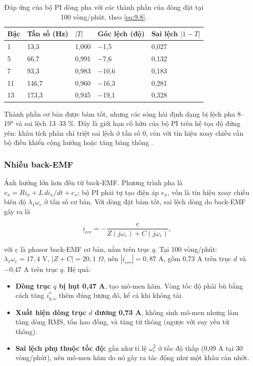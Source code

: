 \begin{table}[H]
\centering\small
\caption{Đáp ứng của bộ PI dòng pha với các thành phần của dòng đặt tại 100 vòng/phút, theo \eqref{eq:9.8}.}\label{tab:9.1}
\begin{tabular}{@{}lllll@{}}
\toprule
Bậc & Tần số (Hz) & $\lvert T \rvert$ & Góc lệch (độ) & Sai lệch $\lvert 1 - T \rvert$ \\ \midrule
1 & 13,3 & 1,000 & $-$1,5 & 0,027 \\
5 & 66,7 & 0,991 & $-$7,6 & 0,132 \\
7 & 93,3 & 0,983 & $-$10,6 & 0,183 \\
11 & 146,7 & 0,960 & $-$16,3 & 0,281 \\
13 & 173,3 & 0,945 & $-$19,1 & 0,328 \\
\bottomrule
\end{tabular}
\end{table}

Thành phần cơ bản được bám tốt, nhưng các sóng hài định dạng bị lệch pha 8–19° và sai lệch 13–33 \%. Đây là giới hạn cố hữu của bộ PI trên hệ tọa độ đứng yên: khâu tích phân chỉ triệt sai lệch ở tần số 0, còn với tín hiệu xoay chiều cần bộ điều khiển cộng hưởng hoặc tăng băng thông \cite{r3}.

\subsubsection{Nhiễu back-EMF}\label{sec:9.3.3}

Ảnh hưởng lớn hơn đến từ back-EMF. Phương trình pha là $v_x = R i_x + L\,di_x/dt + e_x$; bộ PI phải tự tạo điện áp $e_x$, vốn là tín hiệu xoay chiều biên độ $\lambda_1\omega_e$ ở tần số cơ bản. Với dòng đặt bám tốt, sai lệch dòng do back-EMF gây ra là

\begin{equation}
\underline{i}_{err} = -\frac{\underline{e}}{Z(j\omega_e) + C(j\omega_e)},
\tag{9.9}\label{eq:9.9}
\end{equation}

với $\underline{e}$ là phasor back-EMF cơ bản, nằm trên trục $q$. Tại 100 vòng/phút: $\lambda_1\omega_e = 17{,}4$ V, $|Z + C| = 20{,}1$ $\Omega$, nên $|\underline{i}_{err}| = 0{,}87$ A, gồm 0,73 A trên trục $d$ và $-$0,47 A trên trục $q$. Hệ quả:

\begin{itemize}[leftmargin=*]
\item \textbf{Dòng trục $q$ bị hụt 0,47 A}, tạo mô-men hãm. Vòng tốc độ phải bù bằng cách tăng $i_{q,\omega}^*$ thêm đúng lượng đó, kể cả khi không tải.
\item \textbf{Xuất hiện dòng trục $d$ dương 0,73 A}, không sinh mô-men nhưng làm tăng dòng RMS, tổn hao đồng, và tăng từ thông (ngược với suy yếu từ thông).
\item \textbf{Sai lệch phụ thuộc tốc độ:} gần như tỉ lệ $\omega_e^2$ ở tốc độ thấp (0,09 A tại 30 vòng/phút), nên mô-men hãm do nó gây ra tác động như một khâu cản nhớt.
\end{itemize}

